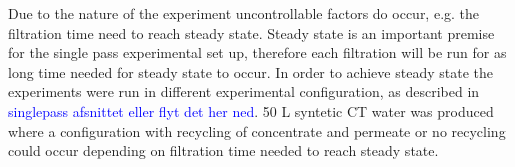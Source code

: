 Due to the nature of the experiment uncontrollable factors do occur, e.g. the filtration time need to reach steady state. 
Steady state is an important premise for the single pass experimental set up, therefore each filtration will be run for as long time needed for steady state to occur. 
In order to achieve steady state the experiments were run in different experimental configuration, as described in \textcolor{blue}{singlepass afsnittet eller flyt det her ned}. 
50 L syntetic CT water was produced where a configuration with recycling of concentrate and permeate or no recycling could occur depending on filtration time needed to reach steady state. 


















